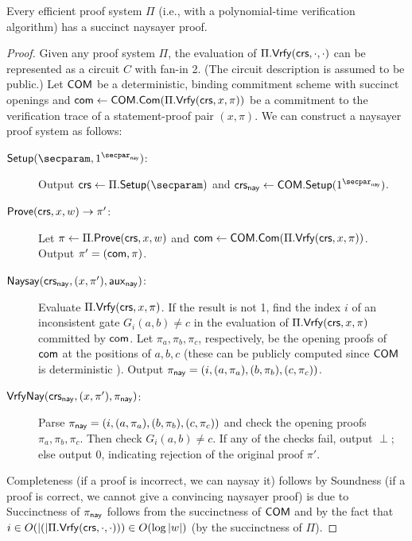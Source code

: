 \begin{theorem}
    Every efficient proof system $\Pi$ (i.e., with a polynomial-time verification algorithm) has a succinct naysayer proof.
\end{theorem}
\begin{proof}
Given any proof system $\Pi$, the evaluation of $\Pi.\mathsf{Vrfy}(\mathsf{crs},\cdot,\cdot)$ can be represented as a circuit $C$ with fan-in 2. (The circuit description is assumed to be public.) Let $\mathsf{COM}$ be a deterministic, binding commitment scheme with succinct openings and $\mathsf{com} \gets \mathsf{COM}.\mathsf{Com}(\Pi.\mathsf{Vrfy}(\mathsf{crs},x,\pi))$ be a commitment to the verification trace of a statement-proof pair $(x,\pi)$. We can construct a naysayer proof system as follows:

\begin{description}
    \item[$\setup(\secparam, \naysecparam)$:] Output $\crs \gets \Pi.\setup(\secparam)$ and $\crs_\nay \gets \COM.\setup(\naysecparam)$.
    \item[$\mathsf{Prove}(\mathsf{crs}, x, w) \to \pi'$:] Let $\pi \gets \Pi.\mathsf{Prove}(\mathsf{crs}, x, w)$ and $\mathsf{com} \gets \mathsf{COM}.\mathsf{Com}(\Pi.\mathsf{Vrfy}(\mathsf{crs}, x, \pi))$. Output $\pi' = (\mathsf{com}, \pi)$.
    \item[$\mathsf{Naysay}(\mathsf{crs}_{\mathsf{nay}}, (x, \pi'), \mathsf{aux}_{\mathsf{nay}})$:] Evaluate $\Pi.\mathsf{Vrfy}(\mathsf{crs}, x, \pi)$. If the result is not 1, find the index $i$ of an inconsistent gate $G_i(a,b) \neq c$ in the evaluation of $\Pi.\mathsf{Vrfy}(\mathsf{crs}, x, \pi)$ committed by $\mathsf{com}$.  Let $\pi_a,\pi_b,\pi_c$, respectively, be the opening proofs of $\mathsf{com}$ at the positions of $a,b,c$ (these can be publicly computed since $\mathsf{COM}$ is deterministic ). Output $\pi_{\mathsf{nay}} = (i, (a, \pi_a), (b, \pi_b), (c, \pi_c))$.
    \item[${\mathsf{Vrfy}}\mathsf{Nay}(\mathsf{crs}_{\mathsf{nay}}, (x, \pi'), \pi_{\mathsf{nay}})$:] Parse $\pi_{\mathsf{nay}} = (i, (a, \pi_a), (b, \pi_b), (c, \pi_c))$ and check the opening proofs $\pi_a, \pi_b, \pi_c$. Then check $G_i(a, b) \neq c$. If any of the checks fail, output $\perp$; else output 0, indicating rejection of the original proof $\pi'$.
\end{description}


Completeness (if a proof is incorrect, we can naysay it) follows by 
Soundness (if a proof is correct, we cannot give a convincing naysayer proof) is due to 
Succinctness of $\pi_{\mathsf{nay}}$ follows from the succinctness of $\mathsf{COM}$ and by the fact that $i \in O(\lvert ( \rvert\Pi.\mathsf{Vrfy}(\mathsf{crs}, \cdot, \cdot))) \in O(\log{\lvert w \rvert})$ (by the succinctness  of $\Pi$).
\end{proof}